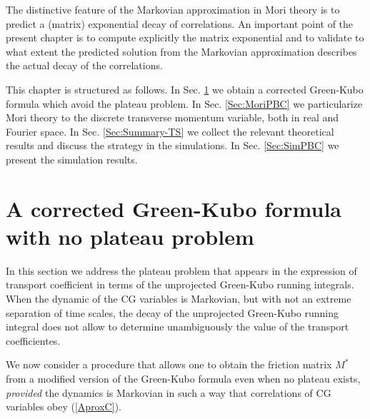 \documentclass[b5paper,openright,10pt]{book}
\begin{document}
The distinctive feature of the  Markovian approximation in Mori theory
is  to  predict  a  (matrix) exponential  decay  of  correlations.  An
important  point of  the present chapter is  to compute  explicitly the
matrix  exponential  and to  validate  to  what extent  the  predicted
solution from  the Markovian approximation describes  the actual decay
of the correlations.

This chapter is structured as follows. 
In Sec. \ref{Sec:GKsi} we obtain a corrected Green-Kubo formula which avoid the plateau problem. 
In Sec. \ref{Sec:MoriPBC} we particularize Mori theory to the discrete transverse momentum variable, both in real and Fourier space. 
In  Sec.  \ref{Sec:Summary-TS}  we  collect  the relevant  theoretical
results  and  discuss  the  strategy  in  the  simulations.   In  Sec.
\ref{Sec:SimPBC}  we   present  the  simulation  results. 

\section{A corrected Green-Kubo formula with no plateau problem}
\label{Sec:GKsi}

In this section we address the plateau problem that appears in the expression of transport coefficient in terms of the unprojected Green-Kubo running integrals. When the dynamic of the CG variables is Markovian, but with not an extreme separation of time scales, the decay of the unprojected Green-Kubo running integral does not allow to determine unambiguously the value of the transport coefficientes. 

We  now consider  a  procedure that  allows one  to  
obtain the  friction matrix  $M^*$
from a modified version of the Green-Kubo formula even when no plateau
exists, \textit{provided} the dynamics 
is  Markovian in  such a  way that
  correlations of CG variables obey (\ref{AproxC}).
\end{document}
